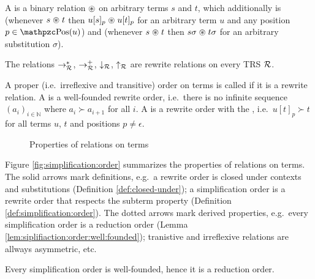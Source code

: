 %
\begin{definition}\label{def:closed-under}
	A  is a binary relation
	\( \mathrel{\circledast} \) on arbitrary terms \( s \) and \( t \),
	which additionally is 
	(whenever \( s\mathrel{\circledast} t \) then \( u[s]_p\mathrel{\circledast} u[t]_p \)
	for an arbitrary term \( u \) and any position \( p\in\pos(u) \))
	and 
	(whenever \( s\mathrel{\circledast} t \) then \( s\sigma\mathrel{\circledast} t\sigma \)
	for an arbitrary substitution \( \sigma \)).
\end{definition}
\begin{lemma}
	The relations \( \rightarrow^*_{\mathcal{R}} \),
	\( \rightarrow^+_{\mathcal{R}} \),
	\( \downarrow_{\mathcal{R}} \), \( \uparrow_{\mathcal{R}} \) are rewrite relations on every TRS \( \mathcal{R} \).
\end{lemma}
\begin{definition}\label{def:simplification:order}
	A proper (i.e.~irreflexive and transitive) order on terms is called  if it is a rewrite relation.
	A  is a well-founded rewrite order,
	i.e.~there is no infinite sequence
	\( (a_i)_{i\in\mathbb{N}} \)
	where \( a_i\succ a_{i+1} \) for all \( i \).
	A  is a rewrite order with the ,
	i.e.~\( u[t]_p \succ t \) for all terms \( u \), \( t \) and positions \( p\neq\epsilon \).
\end{definition}

\begin{figure}[htb]\label{fig:simplification:order}
	
	\caption{Properties of relations on terms}
\end{figure}

Figure \vref{fig:simplification:order} summarizes the properties of relations on terms.
The solid arrows mark definitions,
e.g.~a rewrite order is closed under contexts and substitutions (Definition \ref{def:closed-under});
a simplification order is a rewrite order
that respects the subterm property
(Definition \ref{def:simplification:order}).
The dotted arrows mark derived properties,
e.g.~every simplification order is a reduction order
(Lemma \ref{lem:siplifiaction:order:well:founded});
tranistive and irreflexive relations are allways asymmetric,
etc.

\begin{lemma}\label{lem:siplifiaction:order:well:founded}
	Every simplification order is well-founded, hence it is a reduction order.
\end{lemma}

